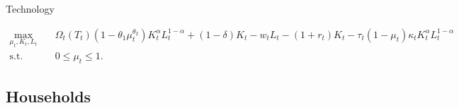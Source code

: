 \documentclass[aspectratio=1610]{beamer}
\begin{document}
\begin{frame}[fragile]{Technology}
\begin{footnotesize}
\begin{equation}
    \begin{aligned}
        \max_{\mu_t, K_t, L_t} & \quad \Omega_t(T_{t}) (1-\theta_1\mu_t^{\theta_2}) K_t^{\alpha} L_t^{1-\alpha} + (1- \delta) K_t -w_tL_t-(1+r_t)K_t - \tau_t (1-\mu_t) \kappa_t K_t^{\alpha} L_t^{1-\alpha} \\
        \text{s.t.} & \quad 0 \leq \mu_t \leq 1.
    \end{aligned}
\end{equation}


\end{footnotesize}

\end{frame}

\subsection*{Households}
\label{sec:households}
\end{document}
